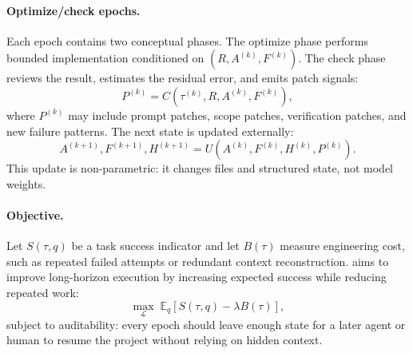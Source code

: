 \paragraph{Optimize/check epochs.}
Each epoch contains two conceptual phases. The optimize phase performs bounded implementation conditioned on $(R,A^{(k)},F^{(k)})$. The check phase reviews the result, estimates the residual error, and emits patch signals:
\begin{equation}
P^{(k)} = C(\tau^{(k)}, R, A^{(k)}, F^{(k)}),
\end{equation}
where $P^{(k)}$ may include prompt patches, scope patches, verification patches, and new failure patterns. The next state is updated externally:
\begin{equation}
A^{(k+1)}, F^{(k+1)}, H^{(k+1)} = U(A^{(k)}, F^{(k)}, H^{(k)}, P^{(k)}).
\end{equation}
This update is non-parametric: it changes files and structured state, not model weights.

\paragraph{Objective.}
Let $S(\tau,q)$ be a task success indicator and let $B(\tau)$ measure engineering cost, such as repeated failed attempts or redundant context reconstruction. \ours{} aims to improve long-horizon execution by increasing expected success while reducing repeated work:
\begin{equation}
\max_{\mathcal{L}} \; \mathbb{E}_{q}\left[S(\tau,q) - \lambda B(\tau)\right],
\end{equation}
subject to auditability: every epoch should leave enough state for a later agent or human to resume the project without relying on hidden context.

